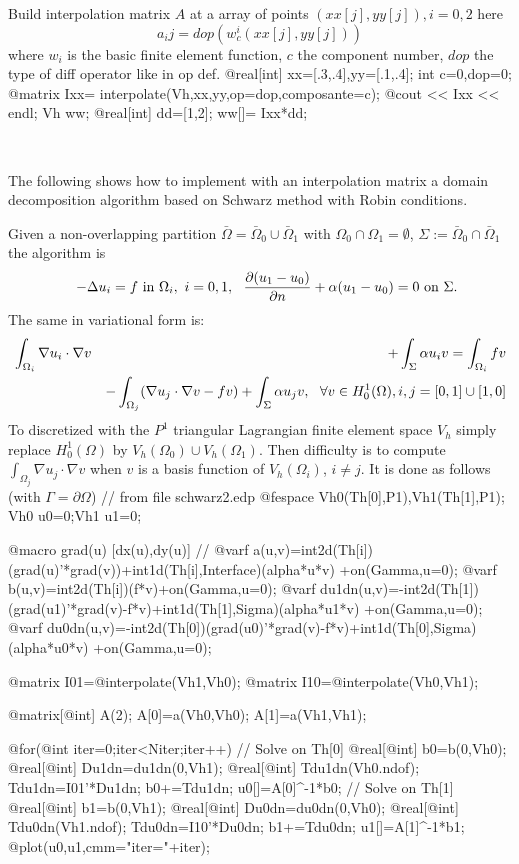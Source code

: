\documentclass[a4paper,twoside,12pt]{book}
\begin{document}
 Build interpolation matrix $A$ at a array of  points $(xx[j],yy[j]),  i = 0, 2$ here
$$  a_ij = dop(w^i_c (xx[j],yy[j]))$$
where $w_i$ is the basic finite element  function, $c$ the component number, $dop$ the type 
of diff operator like in op def. 
\bFF
@real[int] xx=[.3,.4],yy=[.1,.4];
int c=0,dop=0; 
@matrix Ixx= interpolate(Vh,xx,yy,op=dop,composante=c);
@cout << Ixx << endl;
Vh ww;
@real[int] dd=[1,2]; 
ww[]= Ixx*dd;
\eFF
\begin{example}~

The following shows how to implement with an interpolation matrix a domain decomposition algorithm based on Schwarz method with Robin conditions.

Given a non-overlapping partition $\bar\Omega=\bar\Omega_0\cup\bar\Omega_1$ with $\Omega_0\cap\Omega_1=\emptyset$, $\Sigma:=\bar\Omega_0\cap\bar\Omega_1$ the algorithm is
\begin{eqnarray*}&&
-\Delta u_i= f \hbox{ in }\Omega_i,~i=0,1,~~\frac{\partial(u_1-u_0)}{\partial n} + \alpha (u_1-u_0)=0\hbox{ on }\Sigma.
\end{eqnarray*}
The same in variational form is:
\begin{eqnarray*}&
\int_{\Omega_i}\nabla u_i\cdot\nabla v &+ \int_\Sigma\alpha u_i v  = \int_{\Omega_i}f v
\cr&&
- \int_{\Omega_j}(\nabla u_j\cdot\nabla v-f v) + \int_\Sigma\alpha u_j v,~~
\forall v\in H^1_0(\Omega), i,j=[0,1]\cup[1,0]
\end{eqnarray*}
To discretized with the $P^1$ triangular Lagrangian finite element space $V_h$ simply replace $H^1_0(\Omega)$ by $V_h(\Omega_0)\cup V_h(\Omega_1)$.
Then difficulty is to compute $\int_{\Omega_j} \nabla u_j\cdot\nabla v$ when $v$ is a basis function of $V_h(\Omega_i)$, $i\ne j$.  It is done as follows (with $\Gamma=\partial\Omega$)
%
\bFF
// from file schwarz2.edp 
@fespace Vh0(Th[0],P1),Vh1(Th[1],P1);
Vh0 u0=0;Vh1 u1=0;

@macro grad(u) [dx(u),dy(u)] //
@varf a(u,v)=int2d(Th[i])(grad(u)'*grad(v))+int1d(Th[i],Interface)(alpha*u*v)
           +on(Gamma,u=0);
@varf b(u,v)=int2d(Th[i])(f*v)+on(Gamma,u=0);
@varf du1dn(u,v)=-int2d(Th[1])(grad(u1)'*grad(v)-f*v)+int1d(Th[1],Sigma)(alpha*u1*v)
           +on(Gamma,u=0);
@varf du0dn(u,v)=-int2d(Th[0])(grad(u0)'*grad(v)-f*v)+int1d(Th[0],Sigma)(alpha*u0*v)
           +on(Gamma,u=0);

@matrix I01=@interpolate(Vh1,Vh0);
@matrix I10=@interpolate(Vh0,Vh1);

@matrix[@int] A(2);
 A[0]=a(Vh0,Vh0);
 A[1]=a(Vh1,Vh1);

@for(@int iter=0;iter<Niter;iter++)
{
 	 // Solve on Th[0]
	{
		@real[@int] b0=b(0,Vh0);
		@real[@int] Du1dn=du1dn(0,Vh1);
		@real[@int] Tdu1dn(Vh0.ndof); Tdu1dn=I01'*Du1dn;
		b0+=Tdu1dn;
		u0[]=A[0]^-1*b0;
	}
 	 // Solve on Th[1]
	{
		@real[@int] b1=b(0,Vh1);
		@real[@int] Du0dn=du0dn(0,Vh0);
		@real[@int] Tdu0dn(Vh1.ndof); Tdu0dn=I10'*Du0dn;
		b1+=Tdu0dn;
		u1[]=A[1]^-1*b1;
	}
	@plot(u0,u1,cmm="iter="+iter);
}
\eFF
\end{example}
\end{document}
